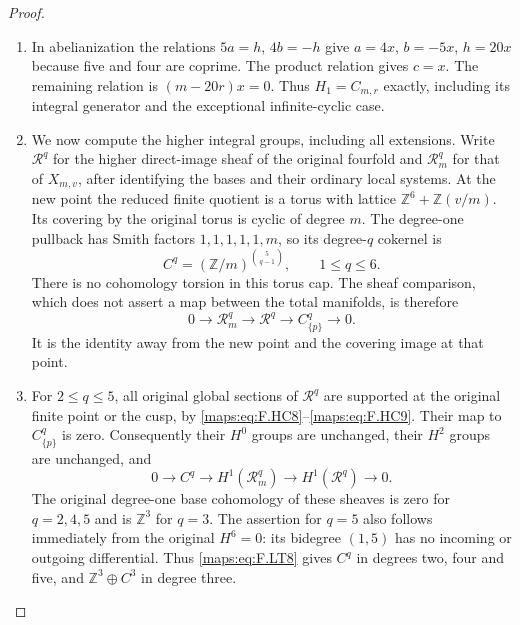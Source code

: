 \begin{proof}
\begin{enumerate}[label=\arabic*.]
\item In abelianization the relations $5a=h$, $4b=-h$
give $a=4x$, $b=-5x$, $h=20x$ because five and four
are coprime.
The product relation gives $c=x$.
The remaining relation is $(m-20r)x=0$.
Thus $H_1=C_{m,r}$ exactly, including its integral
generator and the exceptional infinite-cyclic case.

\item We now compute the higher integral groups, including
all extensions.
Write $\mathcal R^q$ for the higher direct-image
sheaf of the original fourfold and
$\mathcal R_m^q$ for that of $X_{m,v}$, after identifying
the bases and their ordinary local systems.
At the new point the reduced finite quotient is a
torus with lattice
$\mathbb Z^6+\mathbb Z(v/m)$.
Its covering by the original torus is cyclic of
degree $m$.
The degree-one pullback has Smith factors
$1,1,1,1,1,m$, so its degree-$q$ cokernel is
\[
 C^q=(\mathbb Z/m)^{\binom5{q-1}},
 \qquad 1\le q\le6 .
\tag{F.LT6}\label{maps:eq:F.LT6}
\]
There is no cohomology torsion in this torus cap.
The sheaf comparison, which does not assert a map
between the total manifolds, is therefore
\[
 0\longrightarrow\mathcal R_m^q
  \longrightarrow\mathcal R^q
  \longrightarrow C^q_{\{p\}}\longrightarrow0 .
\tag{F.LT7}\label{maps:eq:F.LT7}
\]
It is the identity away from the new point and the
covering image at that point.

\item For $2\le q\le5$, all original global sections of
$\mathcal R^q$ are supported at the original finite
point or the cusp, by \eqref{maps:eq:F.HC8}--\eqref{maps:eq:F.HC9}.
Their map to $C^q_{\{p\}}$ is zero.
Consequently their $H^0$ groups are unchanged,
their $H^2$ groups are unchanged, and
\[
 0\longrightarrow C^q
  \longrightarrow H^1(\mathcal R_m^q)
  \longrightarrow H^1(\mathcal R^q)
  \longrightarrow0 .
\tag{F.LT8}\label{maps:eq:F.LT8}
\]
The original degree-one base cohomology of these
sheaves is zero for $q=2,4,5$ and is $\mathbb Z^3$
for $q=3$.
The assertion for $q=5$ also follows immediately
from the original $H^6=0$: its bidegree $(1,5)$
has no incoming or outgoing differential.
Thus \eqref{maps:eq:F.LT8} gives $C^q$ in degrees two, four and
five, and $\mathbb Z^3\oplus C^3$ in degree three.


\end{enumerate}
\end{proof}
